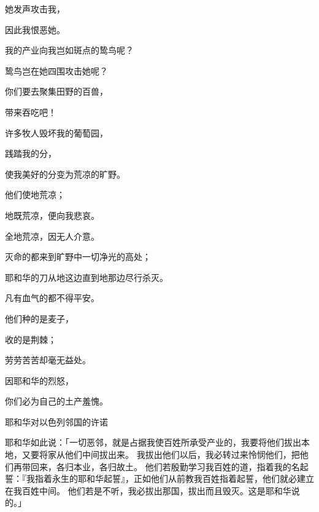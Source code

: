 {\par }{\Q 她发声攻击我，
\par }{\Q 因此我恨恶她。
\par }{\Q {}我的产业向我岂如斑点的鸷鸟呢？
\par }{\Q 鸷鸟岂在她四围攻击她呢？
\par }{\Q 你们要去聚集田野的百兽，
\par }{\Q 带来吞吃吧！
\par }{\Q {}许多牧人毁坏我的葡萄园，
\par }{\Q 践踏我的分，
\par }{\Q 使我美好的分变为荒凉的旷野。
\par }{\Q {}他们使地荒凉；
\par }{\Q 地既荒凉，便向我悲哀。
\par }{\Q 全地荒凉，因无人介意。
\par }{\Q {}灭命的都来到旷野中一切净光的高处；
\par }{\Q 耶和华的刀从地这边直到地那边尽行杀灭。
\par }{\Q 凡有血气的都不得平安。
\par }{\Q {}他们种的是麦子，
\par }{\Q 收的是荆棘；
\par }{\Q 劳劳苦苦却毫无益处。
\par }{\Q 因耶和华的烈怒，
\par }{\Q 你们必为自己的土产羞愧。
\par }{\SH 耶和华对以色列邻国的许诺
\par }{\PP {}耶和华如此说：「一切恶邻，就是占据我使百姓{}所承受产业的，我要将他们拔出本地，又要将{}家从他们中间拔出来。
我拔出他们以后，我必转过来怜悯他们，把他们再带回来，各归本业，各归故土。
他们若殷勤学习我百姓的道，指着我的名起誓{}：『我指着永生的耶和华起誓』，正如他们从前教我百姓指着{}起誓，他们就必建立在我百姓中间。
他们若是不听，我必拔出那国，拔出而且毁灭。这是耶和华说的。」

}

